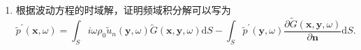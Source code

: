 \begin{enumerate}
    \item 根据波动方程的时域解，证明频域积分解可以写为
    \begin{equation*}
        \tilde{p}^{\prime}(\boldsymbol{x}, \omega)=\int_{S} i \omega \rho_{0} \tilde{u}_{n}(\boldsymbol{y}, \omega) \tilde{G}(\boldsymbol{x}, \boldsymbol{y}, \omega) \mathrm{d} S-\int_{S} \tilde{p}^{\prime}(\boldsymbol{y}, \omega) \frac{\partial \tilde{G}(\boldsymbol{x}, \boldsymbol{y}, \omega)}{\partial \boldsymbol{n}} \mathrm{d} S .
    \end{equation*}

\end{enumerate}
